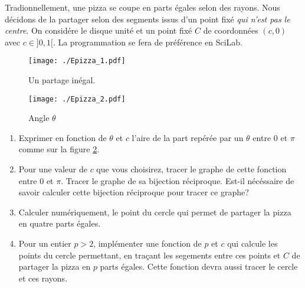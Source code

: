 Tradionnellement, une pizza se coupe en parts égales selon des rayons. Nous décidons de la partager selon des segments issus d'un point fixé \emph{qui n'est pas le centre}.\newline
On considére le disque unité et un point fixé $C$ de coordonnées $(c,0)$ avec $c \in]0,1[$.\newline
La programmation se fera de préférence en SciLab.
\begin{figure}[h]
  \centering
  \texttt{[image: ./Epizza\_1.pdf]}
  \caption{Un partage inégal.}
  \label{fig:Epizza_1}
\end{figure}
\begin{figure}[h]
  \centering
  \texttt{[image: ./Epizza\_2.pdf]}
  \caption{Angle $\theta$}
  \label{fig:Epizza_2}
\end{figure}
\begin{enumerate}
  \item Exprimer en fonction de $\theta$ et $c$ l'aire de la part repérée par un $\theta$ entre $0$ et $\pi$ comme sur la figure \ref{fig:Epizza_2}.
  \item Pour une valeur de $c$ que vous choisirez, tracer le graphe de cette fonction entre $0$ et $\pi$. Tracer le graphe de sa bijection réciproque. Est-il nécéssaire de savoir calculer cette bijection réciproque pour tracer ce graphe?
  \item Calculer numériquement, le point du cercle qui permet de partager la pizza en quatre parts égales.
  \item Pour un entier $p>2$, implémenter une fonction de $p$ et $c$ qui calcule les points du cercle permettant, en traçant les segements entre ces points et $C$ de partager la pizza en $p$ parts égales. Cette fonction devra aussi tracer le cercle et ces rayons.\newline
\end{enumerate}
